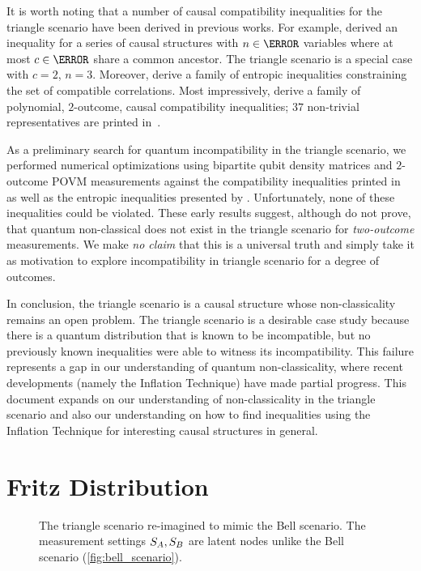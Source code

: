 \documentclass[aps, 10pt, english, twoside, pra, nofootinbib, tightenlines, longbibliography]{revtex4-1}
\begin{document}
    It is worth noting that a number of causal compatibility inequalities for the triangle scenario have been derived in previous works. For example, \citet{Steudel_2010} derived an inequality for a series of causal structures with $n \in \N$ variables where at most $c \in \N$ share a common ancestor. The triangle scenario is a special case with $c = 2$, $n = 3$. Moreover, \citet{Henson_2014} derive a family of entropic inequalities constraining the set of compatible correlations. Most impressively, \citet{Inflation} derive a family of polynomial, $2$-outcome, causal compatibility inequalities; $37$ non-trivial representatives are printed in~\cite{Inflation}.

    As a preliminary search for quantum incompatibility in the triangle scenario, we performed numerical optimizations using bipartite qubit density matrices and $2$-outcome POVM measurements against the compatibility inequalities printed in~\cite{Inflation} as well as the entropic inequalities presented by \citet{Henson_2014}. Unfortunately, none of these inequalities could be violated. These early results suggest, although do not prove, that quantum non-classical does not exist in the triangle scenario for \textit{two-outcome} measurements. We make \textit{no claim} that this is a universal truth and simply take it as motivation to explore incompatibility in triangle scenario for a degree of outcomes.


    In conclusion, the triangle scenario is a causal structure whose non-classicality remains an open problem. The triangle scenario is a desirable case study because there is a quantum distribution that is known to be incompatible, but no previously known inequalities were able to witness its incompatibility. This failure represents a gap in our understanding of quantum non-classicality, where recent developments (namely the Inflation Technique) have made partial progress. This document expands on our understanding of non-classicality in the triangle scenario and also our understanding on how to find inequalities using the Inflation Technique for interesting causal structures in general.

    \section{Fritz Distribution}
    \label{sec:fritz_distribution}
    \begin{figure}
    \begin{center}
        \scalebox{1.0}{}
        \caption{The triangle scenario re-imagined to mimic the Bell scenario. The measurement settings $S_{A},S_{B}$ are latent nodes unlike the Bell scenario (\cref{fig:bell_scenario}).}
        \label{fig:triangle_scenario_with_fritz_bell_embedded}
    \end{center}
    \end{figure}
\end{document}

